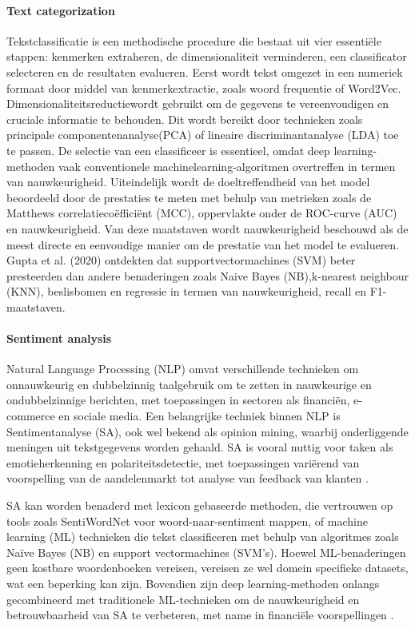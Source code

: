 \paragraph{Text categorization}
Tekstclassificatie is een methodische procedure die bestaat uit vier essentiële stappen: kenmerken extraheren, de dimensionaliteit verminderen, een classificator selecteren en de resultaten evalueren. Eerst wordt tekst omgezet in een numeriek formaat door middel van kenmerkextractie, zoals woord frequentie of Word2Vec. Dimensionaliteitsreductiewordt gebruikt om de gegevens te vereenvoudigen en cruciale informatie te behouden. Dit wordt bereikt door technieken zoals principale componentenanalyse(PCA) of lineaire discriminantanalyse (LDA) toe te passen. De selectie van een classificeer is essentieel, omdat deep learning-methoden vaak conventionele machinelearning-algoritmen overtreffen in termen van nauwkeurigheid. Uiteindelijk wordt de doeltreffendheid van het model beoordeeld door de prestaties te meten met behulp van metrieken zoals de Matthews correlatiecoëfficiënt (MCC), oppervlakte onder de ROC-curve (AUC) en nauwkeurigheid. Van deze maatstaven wordt nauwkeurigheid beschouwd als de meest directe en eenvoudige manier om de prestatie van het model te evalueren. Gupta et al. (2020) ontdekten dat supportvectormachines (SVM) beter presteerden dan andere benaderingen zoals Naive Bayes (NB),k-nearest neighbour (KNN), beslisbomen en regressie in termen van nauwkeurigheid, recall en F1-maatstaven.
\paragraph{Sentiment analysis}
Natural Language Processing (NLP) omvat verschillende technieken om onnauwkeurig en dubbelzinnig taalgebruik om te zetten in nauwkeurige en ondubbelzinnige berichten, met toepassingen in sectoren als financiën, e-commerce en sociale media. Een belangrijke techniek binnen NLP is Sentimentanalyse (SA), ook wel bekend als opinion mining, waarbij onderliggende meningen uit tekstgegevens worden gehaald. SA is vooral nuttig voor taken als emotieherkenning en polariteitsdetectie, met toepassingen variërend van voorspelling van de aandelenmarkt tot analyse van feedback van klanten \autocite{Gupta2020}.

SA kan worden benaderd met lexicon gebaseerde methoden, die vertrouwen op tools zoals SentiWordNet voor woord-naar-sentiment mappen, of machine learning (ML) technieken die tekst classificeren met behulp van algoritmes zoals Naïve Bayes (NB) en support vectormachines (SVM's). Hoewel ML-benaderingen geen kostbare woordenboeken vereisen, vereisen ze wel domein specifieke datasets, wat een beperking kan zijn. Bovendien zijn deep learning-methoden onlangs gecombineerd met traditionele ML-technieken om de nauwkeurigheid en betrouwbaarheid van SA te verbeteren, met name in financiële voorspellingen \autocite{Gupta2020}.















